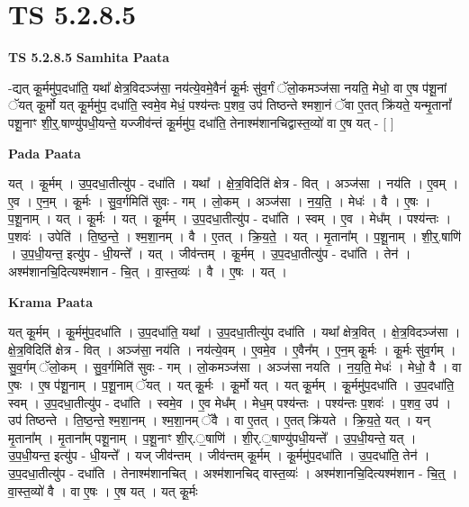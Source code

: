 \documentclass[17pt]{extarticle}
\begin{document}
\section{ TS 5.2.8.5 }

\textbf{TS 5.2.8.5 } \newline
\textbf{Samhita Paata} \newline

-द्यत् कू॒र्ममु॑प॒दधा॑ति॒ यथा᳚ क्षेत्र॒विदञ्ज॑सा॒ नय॑त्ये॒वमे॒वैनं॑ कू॒र्मः सु॑व॒र्गं ॅलो॒कमञ्ज॑सा नयति॒ मेधो॒ वा ए॒ष प॑शू॒नां ॅयत् कू॒र्मो यत् कू॒र्ममु॑प॒ दधा॑ति॒ स्वमे॒व मेधं॒ पश्य॑न्तः प॒शव॒ उप॑ तिष्ठन्ते श्मशा॒नं ॅवा ए॒तत् क्रि॑यते॒ यन्मृ॒तानां᳚ पशू॒नाꣳ शी॒र्॒.षाण्यु॑पधी॒यन्ते॒ यज्जीव॑न्तं कू॒र्ममु॑प॒ दधा॑ति॒ तेनाश्म॑शानचिद्वास्त॒व्यो॑ वा ए॒ष यत् - [  ] \newline

\textbf{Pada Paata} \newline

यत् । कू॒र्मम् । उ॒प॒दधा॒तीत्यु॑प - दधा॑ति । यथा᳚ । क्षे॒त्र॒विदिति॑ क्षेत्र - वित् । अञ्ज॑सा । नय॑ति । ए॒वम् । ए॒व । ए॒न॒म् । कू॒र्मः । सु॒व॒र्गमिति॑ सुवः - गम् । लो॒कम् । अञ्ज॑सा । न॒य॒ति॒ । मेधः॑ । वै । ए॒षः । प॒शू॒नाम् । यत् । कू॒र्मः । यत् । कू॒र्मम् । उ॒प॒दधा॒तीत्यु॑प - दधा॑ति । स्वम् । ए॒व । मेध᳚म् । पश्य॑न्तः । प॒शवः॑ । उपेति॑ । ति॒ष्ठ॒न्ते॒ । श्म॒शा॒नम् । वै । ए॒तत् । क्रि॒य॒ते॒ । यत् । मृ॒ताना᳚म् । प॒शू॒नाम् । शी॒र्॒.षाणि॑ । उ॒प॒धी॒यन्त॒ इत्यु॑प - धी॒यन्ते᳚ । यत् । जीव॑न्तम् । कू॒र्मम् । उ॒प॒दधा॒तीत्यु॑प - दधा॑ति । तेन॑ । अश्म॑शानचि॒दित्यश्म॑शान - चि॒त् । वा॒स्त॒व्यः॑ । वै । ए॒षः । यत् ।  \newline


\textbf{Krama Paata} \newline

यत् कू॒र्मम् । कू॒र्ममु॑प॒दधा॑ति । उ॒प॒दधा॑ति॒ यथा᳚ । उ॒प॒दधा॒तीत्यु॑प दधा॑ति । यथा᳚ क्षेत्र॒वित् । क्षे॒त्र॒विदञ्ज॑सा । क्षे॒त्र॒विदिति॑ क्षेत्र - वित् । अञ्ज॑सा॒ नय॑ति । नय॑त्ये॒वम् । ए॒वमे॒व । ए॒वैन᳚म् । ए॒न॒म् कू॒र्मः । कू॒र्मः सु॑व॒र्गम् । सु॒व॒र्गम् ॅलो॒कम् । सु॒व॒र्गमिति॑ सुवः - गम् । लो॒कमञ्ज॑सा । अञ्ज॑सा नयति । न॒य॒ति॒ मेधः॑ । मेधो॒ वै । वा ए॒षः । ए॒ष प॑शू॒नाम् । प॒शू॒नाम् ॅयत् । यत् कू॒र्मः । कू॒र्मो यत् । यत् कू॒र्मम् । कू॒र्ममु॑प॒दधा॑ति । उ॒प॒दधा॑ति॒ स्वम् । उ॒प॒दधा॒तीत्यु॑प - दधा॑ति । स्वमे॒व । ए॒व मेध᳚म् । मेध॒म् पश्य॑न्तः । पश्य॑न्तः प॒शवः॑ । प॒शव॒ उप॑ । उप॑ तिष्ठन्ते । ति॒ष्ठ॒न्ते॒ श्म॒शा॒नम् । श्म॒शा॒नम् ॅवै । वा ए॒तत् । ए॒तत् क्रि॑यते । क्रि॒य॒ते॒ यत् । यन् मृ॒ताना᳚म् । मृ॒ताना᳚म् पशू॒नाम् । प॒शू॒नाꣳ शी॒र्.॒षाणि॑ । शी॒र्.॒षाण्यु॑पधी॒यन्ते᳚ । उ॒प॒धी॒यन्ते॒ यत् । उ॒प॒धी॒यन्त॒ इत्यु॑प - धी॒यन्ते᳚ । यज् जीव॑न्तम् । जीव॑न्तम् कू॒र्मम् । कू॒र्ममु॑प॒दधा॑ति । उ॒प॒दधा॑ति॒ तेन॑ । उ॒प॒दधा॒तीत्यु॑प - दधा॑ति । तेनाश्म॑शानचित् । अश्म॑शानचिद् वास्त॒व्यः॑ । अश्म॑शानचि॒दित्यश्म॑शान - चि॒त्॒ । वा॒स्त॒व्यो॑ वै । वा ए॒षः । ए॒ष यत् । यत् कू॒र्मः \newline
\end{document}
